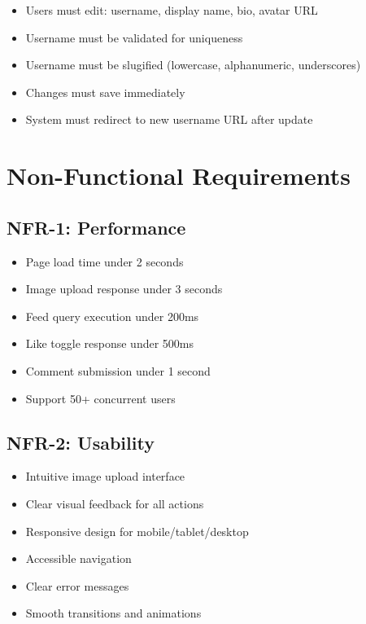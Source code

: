 \documentclass[12pt,a4paper]{report}
\begin{document}
\begin{itemize}
    \item Users must edit: username, display name, bio, avatar URL
    \item Username must be validated for uniqueness
    \item Username must be slugified (lowercase, alphanumeric, underscores)
    \item Changes must save immediately
    \item System must redirect to new username URL after update
\end{itemize}

\section{Non-Functional Requirements}

\subsection{NFR-1: Performance}

\begin{itemize}
    \item Page load time under 2 seconds
    \item Image upload response under 3 seconds
    \item Feed query execution under 200ms
    \item Like toggle response under 500ms
    \item Comment submission under 1 second
    \item Support 50+ concurrent users
\end{itemize}

\subsection{NFR-2: Usability}

\begin{itemize}
    \item Intuitive image upload interface
    \item Clear visual feedback for all actions
    \item Responsive design for mobile/tablet/desktop
    \item Accessible navigation
    \item Clear error messages
    \item Smooth transitions and animations
\end{itemize}
\end{document}
